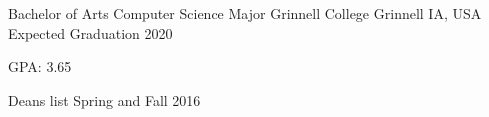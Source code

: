 \begin{cventries}
  \cventry
    {Bachelor of Arts Computer Science Major}
    {Grinnell College}
    {Grinnell IA, USA}
    {Expected Graduation 2020}
    {
      \begin{cvitems}
        \item{GPA: 3.65}
        \item {Deans list Spring and Fall 2016}
      \end{cvitems}
    }
\end{cventries}
